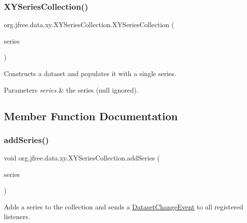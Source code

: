 \subsubsection{\texorpdfstring{X\+Y\+Series\+Collection()}{XYSeriesCollection()}\hspace{0.1cm}{\footnotesize\ttfamily [2/2]}}
{\footnotesize\ttfamily org.\+jfree.\+data.\+xy.\+X\+Y\+Series\+Collection.\+X\+Y\+Series\+Collection (\begin{DoxyParamCaption}\item[{\mbox{\hyperlink{classorg_1_1jfree_1_1data_1_1xy_1_1_x_y_series}{X\+Y\+Series}}}]{series }\end{DoxyParamCaption})}

Constructs a dataset and populates it with a single series.


\begin{DoxyParams}{Parameters}
{\em series} & the series ({\ttfamily null} ignored). \\
\hline
\end{DoxyParams}


\subsection{Member Function Documentation}
\mbox{\label{classorg_1_1jfree_1_1data_1_1xy_1_1_x_y_series_collection_ad13e68c0259c0db589cbfb7899b546aa}} 
\subsubsection{\texorpdfstring{add\+Series()}{addSeries()}}
{\footnotesize\ttfamily void org.\+jfree.\+data.\+xy.\+X\+Y\+Series\+Collection.\+add\+Series (\begin{DoxyParamCaption}\item[{\mbox{\hyperlink{classorg_1_1jfree_1_1data_1_1xy_1_1_x_y_series}{X\+Y\+Series}}}]{series }\end{DoxyParamCaption})}

Adds a series to the collection and sends a \mbox{\hyperlink{}{Dataset\+Change\+Event}} to all registered listeners.


